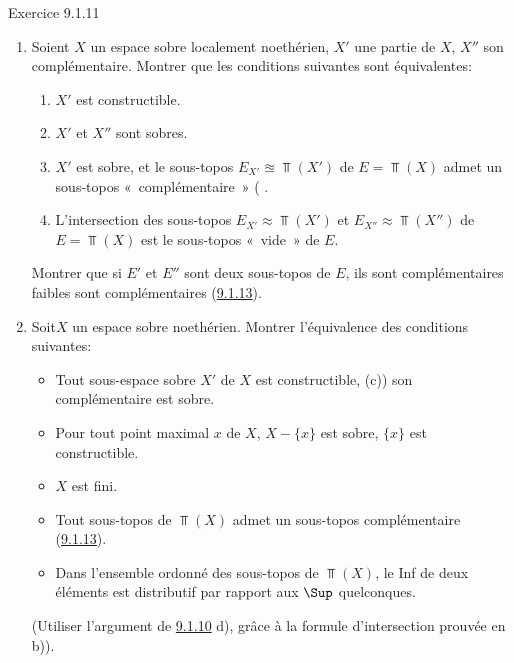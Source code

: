 \documentclass[10pt]{../fichiers-configuration-latex/smfart}
\begin{document}
\begin{enonce*}[remark]{Exercice 9.1.11}
\begin{enumerate}
\item Soient $X$ un espace sobre localement noethérien, $X'$ une
partie de $X$, $X''$ son complémentaire. Montrer que les conditions
suivantes sont équivalentes:
\begin{enumerate}
\renewcommand{\theenumii}{\roman{enumii}}
\renewcommand{\labelenumii}{(\theenumii)}
\item $X'$ est constructible.

\item $X'$ et $X''$ sont sobres.

\item $X'$ est sobre, et le sous-topos $E_{X'}\approxeq \Top(X')$ de
$E=\Top(X)$ admet un sous-topos « complémentaire »  (\cf
{}.

\item L'intersection des sous-topos $E_{X'}\approx\Top(X')$ et
$E_{X''}\approx\Top(X'')$ de $E=\Top(X)$ est le sous-topos
« vide » de $E$.
\end{enumerate}

Montrer que si $E'$ et $E''$ sont deux sous-topos de $E$, ils sont
complémentaires faibles  sont complémentaires
(\hyperref[IV.exer9.1.13]{9.1.13}).

\item Soit\pageoriginale $X$ un espace sobre noethérien. Montrer
l'équivalence des conditions suivantes:
\begin{itemize}
\item[(i)] Tout sous-espace sobre $X'$ de $X$ est constructible, \ie
(c)) son complémentaire est sobre.

\item[(i bis)] Pour tout point maximal $x$ de $X$, $X-\{x\}$ est
sobre, \ie $\{x\}$ est constructible.

\item[(ii)] $X$ est fini.

\item[(iii)] Tout sous-topos de $\Top(X)$ admet un sous-topos
complémentaire (\cf \hyperref[IV.exer9.1.13]{9.1.13}).

\item[(iv)] Dans l'ensemble ordonné des sous-topos de $\Top(X)$, le
Inf de deux éléments est distributif par rapport aux $\Sup$
quelconques.
\end{itemize}
(Utiliser l'argument de \hyperref[IV.exer9.1.10]{9.1.10} d), grâce à la formule
d'intersection prouvée en b)).


\end{enumerate}
\end{enonce*}
\end{document}
